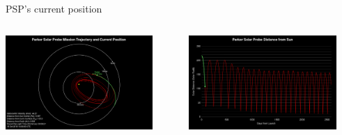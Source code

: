 \begin{frame}[c]{PSP's current position}{}
	\begin{columns}[t]	%
	
		\hspace*{-21pt}
		\includegraphics[height=0.85\textwidth]{../talk_figures/psp201810_0400_top.png}

	
		\hspace*{-21pt}
		\includegraphics[height=0.85\textwidth]{../talk_figures/psp201810_0400_bottom.png}
		
	\end{columns}
\end{frame}

